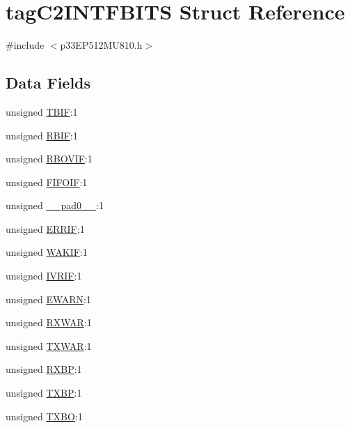 \hypertarget{structtag_c2_i_n_t_f_b_i_t_s}{}\section{tag\+C2\+I\+N\+T\+F\+B\+I\+TS Struct Reference}
\label{structtag_c2_i_n_t_f_b_i_t_s}


{\ttfamily \#include $<$p33\+E\+P512\+M\+U810.\+h$>$}

\subsection*{Data Fields}
\begin{DoxyCompactItemize}
\item 
unsigned \hyperlink{structtag_c2_i_n_t_f_b_i_t_s_af48a2e866e1aeeb62bb2962746d7ce7f}{T\+B\+IF}\+:1
\item 
unsigned \hyperlink{structtag_c2_i_n_t_f_b_i_t_s_ad8f6df4237b4615b8389534a9bd451da}{R\+B\+IF}\+:1
\item 
unsigned \hyperlink{structtag_c2_i_n_t_f_b_i_t_s_a60e9b9f5e30376a0795eefa09cc0eb14}{R\+B\+O\+V\+IF}\+:1
\item 
unsigned \hyperlink{structtag_c2_i_n_t_f_b_i_t_s_a9c3e21be2d8d9122ed6f61d5c675385a}{F\+I\+F\+O\+IF}\+:1
\item 
unsigned \hyperlink{structtag_c2_i_n_t_f_b_i_t_s_adf71f3d8410c1f1dbbc96680a92c49af}{\+\_\+\+\_\+pad0\+\_\+\+\_\+}\+:1
\item 
unsigned \hyperlink{structtag_c2_i_n_t_f_b_i_t_s_a62aac73179ca441b764a9e62698a5a28}{E\+R\+R\+IF}\+:1
\item 
unsigned \hyperlink{structtag_c2_i_n_t_f_b_i_t_s_aede7ce476b475e1cd66dffa184f2daa1}{W\+A\+K\+IF}\+:1
\item 
unsigned \hyperlink{structtag_c2_i_n_t_f_b_i_t_s_a5a63b230ca0f7c3efb1fadd88115ed5c}{I\+V\+R\+IF}\+:1
\item 
unsigned \hyperlink{structtag_c2_i_n_t_f_b_i_t_s_ab3ab490c08fd5a31b6369336577ae209}{E\+W\+A\+RN}\+:1
\item 
unsigned \hyperlink{structtag_c2_i_n_t_f_b_i_t_s_addd555f3cd835526434df03b9ea5c71e}{R\+X\+W\+AR}\+:1
\item 
unsigned \hyperlink{structtag_c2_i_n_t_f_b_i_t_s_ac9817dd2af797e3801322ff283de379e}{T\+X\+W\+AR}\+:1
\item 
unsigned \hyperlink{structtag_c2_i_n_t_f_b_i_t_s_a953d8f21b3b98f0779f1bf72e0d47c62}{R\+X\+BP}\+:1
\item 
unsigned \hyperlink{structtag_c2_i_n_t_f_b_i_t_s_a5786f0e7a7a316717ee7fc4b36a91284}{T\+X\+BP}\+:1
\item 
unsigned \hyperlink{structtag_c2_i_n_t_f_b_i_t_s_a2f832810cd057ffa5ffcde300d853a1b}{T\+X\+BO}\+:1
\end{DoxyCompactItemize}


